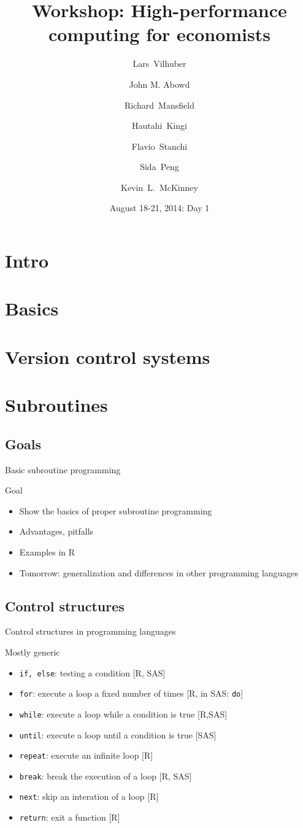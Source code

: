 \documentclass[xcolor=table,compress]{beamer}
\title[Computing for Economists]{Workshop: High-performance computing for economists}
\author[Vilhuber, Abowd, Mansfield, McKinney]{%
  Lars~Vilhuber\inst{1} \and
  John M. Abowd\inst{1} \and
  Richard~Mansfield\inst{1} \and
  Hautahi~Kingi\inst{1} \and
  Flavio~Stanchi\inst{1} \and
  Sida~Peng\inst{1} \and
  Kevin~L.~McKinney %
}
\institute[Cornell]{
  \inst{1}%
   Cornell University, Economics Department,
}%
\date[August 18-21, 2014]{August 18-21, 2014: Day 1}
\begin{document}
\frame{\titlepage}
\section{Intro}
\section{Basics}
\section[VCS]{Version control systems}
\section{Subroutines}

\subsection{Goals}
\begin{frame}{Basic subroutine programming}
\begin{block}{Goal}
\begin{itemize}
\item Show the basics of proper subroutine programming
\item Advantages, pitfalls
\item Examples in R
\item Tomorrow: generalization and differences in other programming languages
\end{itemize}
\end{block}
\end{frame}
\subsection[Control]{Control structures}
\begin{frame}{Control structures in programming languages}
\small
\begin{block}{Mostly generic}
\begin{itemize}
\item \texttt{if, else}: testing a condition [R, SAS] 
\item \texttt{for}: execute a loop a fixed number of times [R, in SAS: \texttt{do}]
\item \texttt{while}: execute a loop while a condition is true [R,SAS]
\item \texttt{until}: execute a loop until a condition is true [SAS]
\item \texttt{repeat}: execute an infinite loop [R]
\item \texttt{break}: break the execution of a loop [R, SAS]
\item \texttt{next}: skip an interation of a loop [R]
\item \texttt{return}: exit a function [R]
\end{itemize}
\end{block}
\end{frame}
\end{document}

